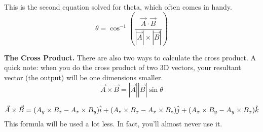 This is the second equation solved for theta, which often comes in handy.
\begin{equation}
    \theta = \cos^{-1} \left( {\frac{\vec{A} \cdot \vec{B}}{|\vec{A}| \times |\vec{B}|}} \right)
\end{equation}

\noindent \textbf{The Cross Product.}
There are also two ways to calculate the cross product. A quick note: when you do the cross product of two 3D vectors, your resultant vector (the
output) will be one dimensions smaller. 
\begin{equation}
    \vec{A} \times \vec{B} = |\vec{A}||\vec{B}| \sin \theta
\end{equation}

\begin{equation}
    \vec{A} \times \vec{B} = (A_y \times B_z - A_z \times B_y)\hat{i} + (A_z \times B_x - A_x \times B_z)\hat{j} + (A_x \times B_y - A_y \times B_x)\hat{k} \\
\end{equation}
This formula will be used a lot less. In fact, you'll almost never use it.